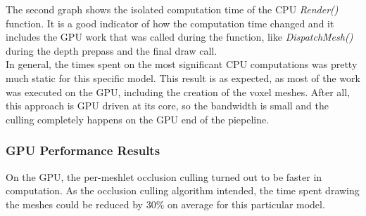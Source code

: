 \noindent
The second graph shows the isolated computation time of the \ac{CPU} \emph{Render()} function. It is a good indicator of 
how the computation time changed and it includes the \ac{GPU} work that was called during the function, like 
\emph{DispatchMesh()} during the depth prepass and the final draw call. \\

\noindent
In general, the times spent on the most significant \ac{CPU} computations was pretty much static for this specific 
model. This result is as expected, as most of the work was executed on the \ac{GPU}, including the creation of the 
voxel meshes. After all, this approach is \ac{GPU} driven at its core, so the bandwidth is small and the culling 
completely happens on the \ac{GPU} end of the piepeline.

\subsubsection*{GPU Performance Results} \label{subsubsec-gpu-performance-results-lucy}


On the \ac{GPU}, the per-meshlet occlusion culling turned out to be faster in computation. As the occlusion 
culling algorithm intended, the time spent drawing the meshes could be reduced by $30\%$ on average for this 
particular model.

